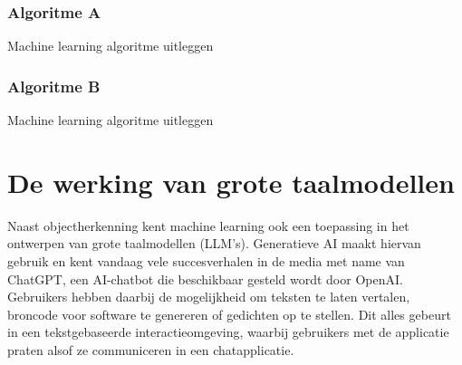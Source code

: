 \subsubsection{Algoritme A}
Machine learning algoritme uitleggen

\subsubsection{Algoritme B}
Machine learning algoritme uitleggen


\section{De werking van grote taalmodellen}
\label{sec:ls-artificiele-intelligentie}
Naast objectherkenning kent machine learning ook een toepassing in het ontwerpen van grote taalmodellen (LLM's).
Generatieve AI maakt hiervan gebruik en kent vandaag vele succesverhalen in de media met name van ChatGPT, een AI-chatbot die beschikbaar gesteld wordt door OpenAI\@.
Gebruikers hebben daarbij de mogelijkheid om teksten te laten vertalen, broncode voor software te genereren of gedichten op te stellen.
Dit alles gebeurt in een tekstgebaseerde interactieomgeving, waarbij gebruikers met de applicatie praten alsof ze communiceren in een chatapplicatie.
